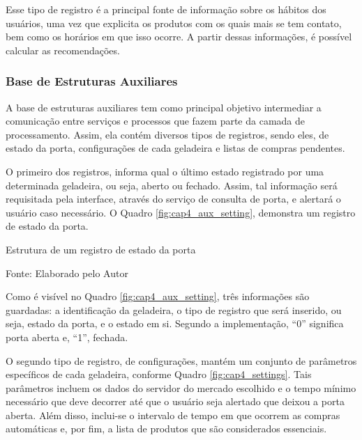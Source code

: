 Esse tipo de registro é a principal fonte de informação sobre os hábitos dos usuários, uma vez que explicita os produtos com os quais mais se tem contato, bem como os horários em que isso ocorre. A partir dessas informações, é possível calcular as recomendações.


\ProximoForaDoSumario 
\subsubsection{Base de Estruturas Auxiliares}  \label{sssec:base_est-aux}

A base de estruturas auxiliares tem como principal objetivo intermediar a comunicação entre serviços e processos que fazem parte da camada de processamento. Assim, ela contém diversos tipos de registros, sendo eles, de estado da porta, configurações de cada geladeira e listas de compras pendentes.

O primeiro dos registros, informa qual o último estado registrado por uma determinada geladeira, ou seja, aberto ou fechado. Assim, tal informação será requisitada pela interface, através do serviço de consulta de porta, e alertará o usuário caso necessário. O Quadro \ref{fig:cap4_aux_setting}, demonstra um registro de estado da porta.

\begin{quadro}[htb]
    \caption{Estrutura de um registro de estado da porta}
    \label{fig:cap4_aux_setting}
    
    \footnotesize{Fonte: Elaborado pelo Autor}
\end{quadro}

Como é visível no Quadro \ref{fig:cap4_aux_setting}, três informações são guardadas: a identificação da geladeira, o tipo de registro que será inserido, ou seja, estado da porta, e o estado em si. Segundo a implementação, ``0'' significa porta aberta e, ``1'', fechada.

O segundo tipo de registro, de configurações, mantém um conjunto de parâmetros específicos de cada geladeira, conforme Quadro \ref{fig:cap4_settings}. 
Tais parâmetros incluem os dados do servidor do mercado escolhido e o tempo mínimo necessário que deve decorrer até que o usuário seja alertado que deixou a porta aberta. Além disso, inclui-se o intervalo de tempo em que ocorrem as compras automáticas e, por fim, a lista de produtos que são considerados essenciais.

